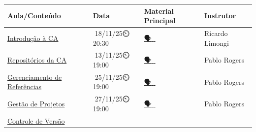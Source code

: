 \documentclass[
  a4paper,
]{book}
\newcommand{\emojitext}[1]{{\emoji #1}}
\begin{document}
\begin{longtable}[]{@{}
  >{\raggedright\arraybackslash}p{}
  >{\centering\arraybackslash}p{}
  >{\centering\arraybackslash}p{}
  >{\centering\arraybackslash}p{}@{}}
\toprule\noalign{}
\begin{minipage}[b]{\linewidth}\raggedright
Aula/Conteúdo
\end{minipage} & \begin{minipage}[b]{\linewidth}\centering
Data
\end{minipage} & \begin{minipage}[b]{\linewidth}\centering
Material Principal
\end{minipage} & \begin{minipage}[b]{\linewidth}\centering
Instrutor
\end{minipage} \\
\midrule\noalign{}
\endhead
\bottomrule\noalign{}
\endlastfoot
\href{01-intro.html}{Introdução à CA} &
\emojitext{📅}18/11/25\emojitext{⏲️}20:30 &
\href{./resources/01-intro.pdf}{\emojitext{🗣}}\href{https://www.youtube.com/live/7ewEcTATkZM?si=Lq40IAoDgsy_A619}{\emojitext{🎥}}\href{https://bar.anpad.org.br/index.php/bar/article/view/702}{\emojitext{📓}}
& Ricardo Limongi \\
\href{02-osf.html}{Repositórios da CA} &
\emojitext{📅}13/11/25\emojitext{⏲️}19:00 &
\href{./resources/02-osf-ppt.html}{\emojitext{🗣️}}\href{https://youtu.be/i5H9BmOF5Ng?si=pqRbjsu32HEjrElG}{\emojitext{🎥}}\href{https://bar.anpad.org.br/index.php/bar/article/view/712}{\emojitext{📓}}
& Pablo Rogers \\
\href{03-zotero.html}{Gerenciamento de Referências} &
\emojitext{📅}25/11/25\emojitext{⏲️}19:00 &
\href{https://www.ufrgs.br/super8/wp-content/uploads/apresentacoes/zotero-gerenciador-referencias.pdf}{\emojitext{🗣️}}\href{https://www.youtube.com/live/gdYMiezOFiE}{\emojitext{🎥}}\href{https://bar.anpad.org.br/index.php/bar/article/view/722}{\emojitext{📓}}
& Pablo Rogers \\
\href{04-project.html}{Gestão de Projetos} &
\emojitext{📅}27/11/25\emojitext{⏲️}19:00 &
\href{./resources/04-project-ppt.html}{\emojitext{🗣️}}\href{https://youtu.be/vSLxtsZrprE?si=eEP0C1dihYGDsiy5&t=868}{\emojitext{🎥}}\href{https://journals.plos.org/ploscompbiol/article?id=10.1371/journal.pcbi.1005510}{\emojitext{📓}}
& Pablo Rogers \\
\href{05-git.html}{Controle de Versão} &

\end{longtable}
\end{document}
